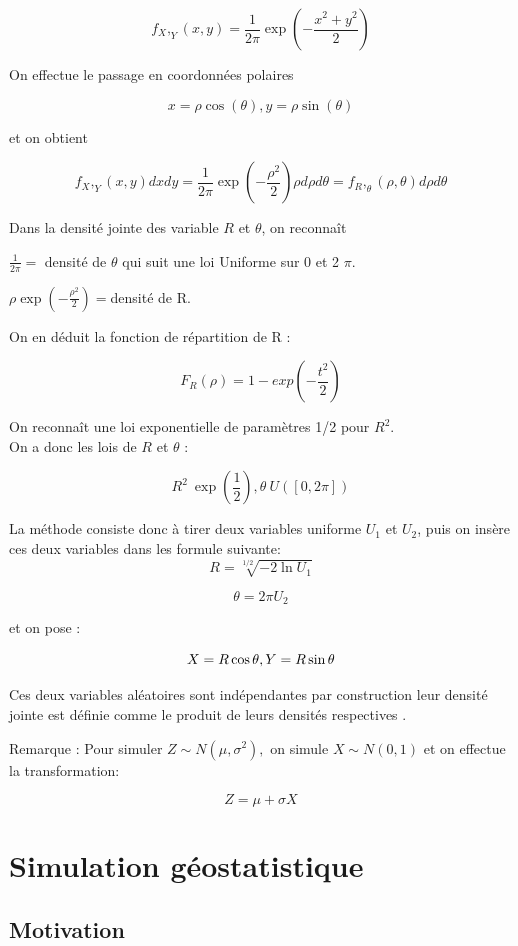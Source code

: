 \documentclass[10pt]{article} %
\begin{document}
$$f_X,_Y(x,y) = \frac{1}{2\pi}\exp(-\frac {x^2+y^2}{2})$$

On effectue le passage en coordonnées polaires

$$x = \rho \cos(\theta), y = \rho \sin(\theta)$$

et on obtient

$$f_X,_Y(x,y)dxdy = \frac {1}{2\pi}\exp(-\frac {\rho^2}{2})\rho d\rho d\theta = f_R,_\theta(\rho,\theta)d\rho d\theta$$

Dans la densité jointe des variable $R$ et $\theta$, on reconnaît

$\frac{1}{2\pi} =$ densité de $\theta$ qui suit une loi Uniforme sur 0 et 2 $\pi$.


$\rho \exp(-\frac{\rho^2}{2}) = $densité de R.

On en déduit la fonction de répartition de R :

$$F_R(\rho) = 1- exp(-\frac{t^2}{2})$$

On reconnaît une loi exponentielle de paramètres 1/2 pour $R^2$.\\
On a donc les lois de $R$ et  $\theta$ :

$$R^2 ~ \exp(\frac{1}{2}), \theta ~ U([0, 2\pi])$$

La méthode consiste donc à tirer deux variables uniforme $U_1$ et $U_2$, puis on insère ces deux variables dans les formule suivante: \\

$$R = \sqrt[1/2]{-2 \ln U_1}$$

$$\theta = 2\pi U_2$$

et on pose :

$$X = R\cos\theta, \\
Y = R\sin\theta$$

Ces deux variables aléatoires sont indépendantes par construction leur densité jointe est définie comme le produit de leurs densités respectives .

Remarque : Pour simuler $Z \sim N (\mu, \sigma^2 ),$ on simule $X \sim N (0, 1)$ et on effectue la transformation:

 $$Z = \mu + \sigma X$$





\section{Simulation géostatistique}

\subsection{Motivation}
\end{document}
